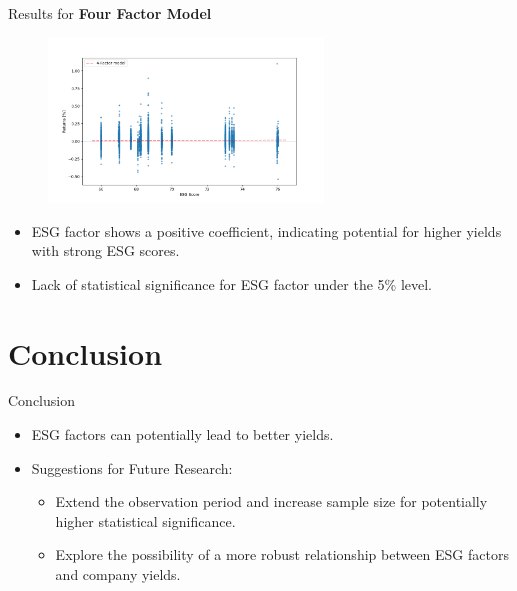 \documentclass{beamer}
\begin{document}
\begin{frame}{Results for \textbf{Four Factor Model}}
  \begin{figure}
    \includegraphics[width=0.65\textwidth]{figures/regression.png}
    \centering
  \end{figure}
      \begin{itemize}
        \item ESG factor shows a positive coefficient, indicating potential for higher yields with strong ESG scores.
        \item Lack of statistical significance for ESG factor under the 5\% level.
      \end{itemize}
\end{frame}

\section{Conclusion}
\begin{frame}{Conclusion}
  \begin{itemize}
    \item ESG factors can potentially lead to better yields.
\item Suggestions for Future Research:
      \begin{itemize}
        \item Extend the observation period and increase sample size for potentially higher statistical significance.
        \item Explore the possibility of a more robust relationship between ESG factors and company yields.
        \end{itemize}
  \end{itemize}
\end{frame}
\end{document}

